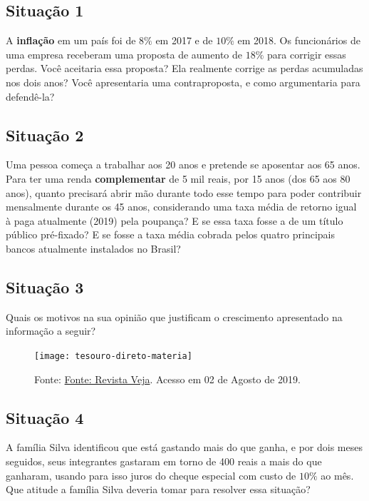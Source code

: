 \subsection{Situação 1}
A \textbf{inflação} em um país foi de $8\%$ em 2017 e de $10\%$ em 2018. Os funcionários de uma empresa receberam uma proposta de aumento de $18\%$ para corrigir essas perdas. Você aceitaria essa proposta? Ela realmente corrige as perdas acumuladas nos dois anos? Você apresentaria uma contraproposta, e como argumentaria para defendê-la?


\subsection{Situação 2}
Uma pessoa começa a trabalhar aos 20 anos e pretende se aposentar aos 65 anos. Para ter uma renda \textbf{complementar} de 5 mil reais, por 15 anos (dos 65 aos 80 anos), quanto precisará abrir mão durante todo esse tempo para poder contribuir mensalmente durante os 45 anos, considerando uma taxa média de retorno igual à paga atualmente (2019) pela poupança? E se essa taxa fosse a de um título público pré-fixado? E se fosse a taxa média cobrada pelos quatro principais bancos atualmente instalados no Brasil? 


\subsection{Situação 3}
Quais os motivos na sua opinião que justificam o crescimento apresentado na informação a seguir?


\begin{figure}[H]
\centering
\noindent\texttt{[image: tesouro-direto-materia]}

\caption{Fonte: \href{https://veja.abril.com.br/economia/investidores-no-tesouro-direto-crescem-36-no-primeiro-semestre/}{Fonte: Revista Veja}. Acesso em 02 de Agosto de 2019.}
\end{figure}



\subsection{Situação 4}
A família Silva identificou que está gastando mais do que ganha, e por dois meses seguidos, seus integrantes gastaram em torno de 400 reais a mais do que ganharam, usando para isso juros do cheque especial com custo de $10\%$ ao mês. Que atitude a família Silva deveria tomar para resolver essa situação? 


